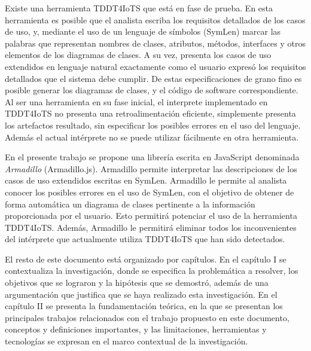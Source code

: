 Existe una herramienta TDDT4IoTS \parencite{tddt4iots} que está en fase de prueba. En esta herramienta es posible que el analista escriba los requisitos detallados de los casos de uso, y, mediante el uso de un lenguaje de símbolos (SymLen) marcar las palabras que representan nombres de clases, atributos, métodos, interfaces y otros elementos de los diagramas de clases. A su vez, presenta los casos de uso extendidos en lenguaje natural exactamente como el usuario expresó los requisitos detallados que el sistema debe cumplir. De estas especificaciones de grano fino es posible generar los diagramas de clases, y el código de software correspondiente. Al ser una herramienta en su fase inicial, el interprete implementado en TDDT4IoTS no presenta una retroalimentación eficiente, simplemente presenta los artefactos resultado, sin especificar los posibles errores en el uso del lenguaje. Además el actual intérprete no se puede utilizar fácilmente en otra herramienta.

En el presente trabajo se propone una librería escrita en JavaScript denominada \textit{Armadillo} (Armadillo.js). Armadillo permite interpretar las descripciones de los casos de uso extendidos escritas en SymLen. Armadillo le permite al analista conocer los posibles errores en el uso de SymLen, con el objetivo de obtener de forma automática un diagrama de clases pertinente a la información proporcionada por el usuario. Esto permitirá potenciar el uso de la herramienta TDDT4IoTS. Además, Armadillo le permitirá eliminar todos los inconvenientes del intérprete que actualmente utiliza TDDT4IoTS que han sido detectados.

El resto de este documento está organizado por capítulos. En el capítulo I se contextualiza la investigación, donde se especifica la problemática a resolver, los objetivos que se lograron y la hipótesis que se demostró, además de una argumentación que justifica que se haya realizado esta investigación. En el capítulo II se presenta la fundamentación teórica, en la que se presentan los principales trabajos relacionados con el trabajo propuesto en este documento, conceptos y definiciones importantes, y las limitaciones, herramientas y tecnologías se expresan en el marco contextual de la investigación.


